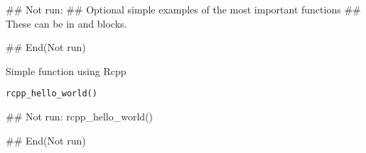 \documentclass[letterpaper]{book}
\begin{document}
%
\begin{Examples}
\begin{ExampleCode}
  ## Not run: 
     ## Optional simple examples of the most important functions
     ## These can be in \dontrun{} and \donttest{} blocks.   
  
## End(Not run)
\end{ExampleCode}
\end{Examples}
%
\begin{Description}\relax
Simple function using Rcpp
\end{Description}
%
\begin{Usage}
\begin{verbatim}
rcpp_hello_world()	
\end{verbatim}
\end{Usage}
%
\begin{Examples}
\begin{ExampleCode}
## Not run: 
rcpp_hello_world()

## End(Not run)
\end{ExampleCode}
\end{Examples}
\printindex{}
\end{document}

